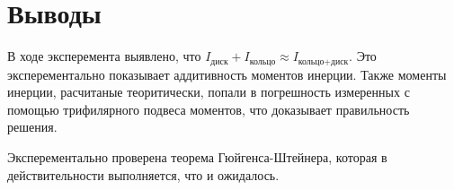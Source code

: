 \section{Выводы}
В ходе эксперемента выявлено, что
$I_\text{диск} + I_\text{кольцо} \approx I_\text{кольцо+диск}$.
Это эксперементально показывает аддитивность моментов
инерции.
Также моменты инерции, расчитаные теоритически, попали в
погрешность измеренных с помощью трифилярного подвеса
моментов, что доказывает правильность решения.

Эксперементально проверена теорема Гюйгенса-Штейнера,
которая в действительности выполняется, что и ожидалось.
